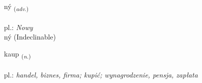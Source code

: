 \documentclass[frontgrid, backgrid]{flacards}\usepackage[]{graphicx}\usepackage[]{xcolor}
\begin{document}

\renewcommand{\flhead}{\vskip5pt \fboxsep=0pt {\small\bfseries\footnotesize Atviksorð | przysłówek}}
\renewcommand{\fcfoot}{\vskip5pt \fboxsep=0pt \hspace{2pt}{\small\bfseries\footnotesize 1K}}

\renewcommand{\blhead}{\vskip5pt {\small\bfseries\footnotesize Atviksorð | przysłówek }}
\renewcommand{\bcfoot}{\vskip5pt \hspace{2pt}{\small\bfseries\footnotesize 1K}}


{ný \small{\textsubscript{(\textit{adv.})}} \\[1ex]
\textphonetic{[niː]} \\
pl.: \emph{Nowy} \\  [2ex]
ný (Indeclinable)}

\renewcommand{\flhead}{\vskip5pt \fboxsep=0pt {\small\bfseries\footnotesize Nafnorð | rzeczownik}}
\renewcommand{\fcfoot}{\vskip5pt \fboxsep=0pt \hspace{2pt}{\small\bfseries\footnotesize 1K}}

\renewcommand{\blhead}{\vskip5pt {\small\bfseries\footnotesize Nafnorð | rzeczownik }}
\renewcommand{\bcfoot}{\vskip5pt \hspace{2pt}{\small\bfseries\footnotesize 1K}}


{kaup \small{\textsubscript{(\textit{n.})}} \\[1ex] %
\textphonetic{[kʰœiːp]} \\
pl.: \emph{handel, biznes, firma; kupić; wynagrodzenie, pensja, zapłata} \\  [2ex]
\renewcommand*{\arraystretch}{0.8}
}

\renewcommand{\flhead}{\vskip5pt \fboxsep=0pt {\small\bfseries\footnotesize Nafnorð | rzeczownik}}
\renewcommand{\fcfoot}{\vskip5pt \fboxsep=0pt \hspace{2pt}{\small\bfseries\footnotesize 1K}}
\end{document}
